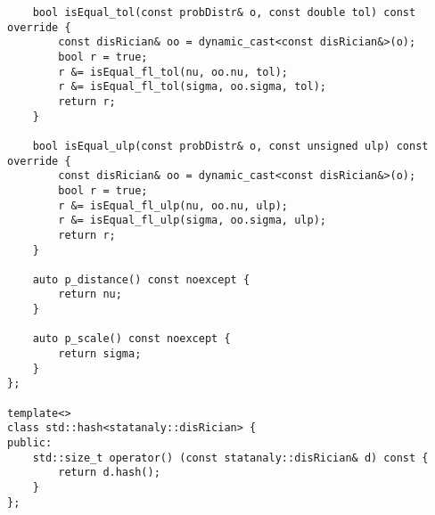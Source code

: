 \begin{verbatim}
    bool isEqual_tol(const probDistr& o, const double tol) const override {
        const disRician& oo = dynamic_cast<const disRician&>(o);
        bool r = true;
        r &= isEqual_fl_tol(nu, oo.nu, tol);
        r &= isEqual_fl_tol(sigma, oo.sigma, tol);
        return r;
    }

    bool isEqual_ulp(const probDistr& o, const unsigned ulp) const override {
        const disRician& oo = dynamic_cast<const disRician&>(o);
        bool r = true;
        r &= isEqual_fl_ulp(nu, oo.nu, ulp);
        r &= isEqual_fl_ulp(sigma, oo.sigma, ulp);
        return r;
    }

    auto p_distance() const noexcept {
        return nu;
    }

    auto p_scale() const noexcept {
        return sigma;
    }
};

template<>
class std::hash<statanaly::disRician> {
public:
    std::size_t operator() (const statanaly::disRician& d) const {
        return d.hash();
    }
};
\end{verbatim}